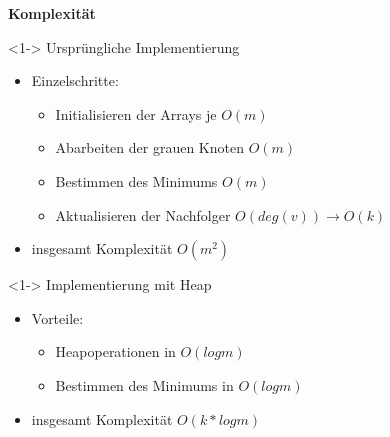 \begin{frame}
	\begin{center}
		\LARGE {\textbf{Komplexität}}
	\end{center}
\end{frame}

\begin{frame}
	\begin{block} <1-> {Ursprüngliche Implementierung}
		\begin{itemize}
			\item <2-> Einzelschritte:
			\begin{itemize}
				\item <3-> Initialisieren der Arrays je $O(m)$
				\item <4-> Abarbeiten der grauen Knoten $O(m)$
				\item <5-> Bestimmen des Minimums $O(m)$
				\item <6-> Aktualisieren der Nachfolger $O(deg(v)) \rightarrow O(k)$
			\end{itemize}
			\item <7-> insgesamt Komplexität $O(m^{2})$
		\end{itemize}
	\end{block}	
\end{frame}

\begin{frame}
	\begin{block} <1-> {Implementierung mit Heap}
		\begin{itemize}
			\item <1-> Vorteile:
			\begin{itemize}
				\item <2-> Heapoperationen in $O(log m)$
				\item <3-> Bestimmen des Minimums in $O(log m)$
			\end{itemize}
			\item <4-> insgesamt Komplexität $O(k*log m)$
		\end{itemize}
	\end{block}		
\end{frame}